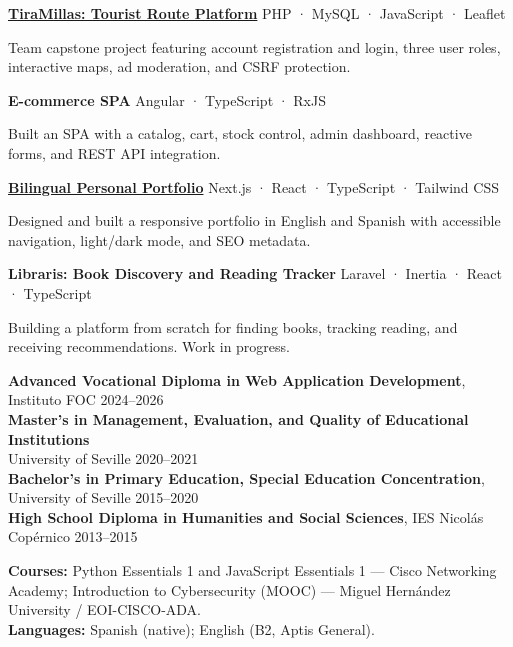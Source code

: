 \documentclass[10pt]{article}
\begin{document}
\textbf{\href{https://github.com/Loreber/TiraMillas}{TiraMillas: Tourist Route Platform}} \hfill PHP · MySQL · JavaScript · Leaflet

\entryspace
\begin{highlights}
  \item Team capstone project featuring account registration and login, three user roles, interactive maps, ad moderation, and CSRF protection.
\end{highlights}

\entryspace
\textbf{E-commerce SPA} \hfill Angular · TypeScript · RxJS

\entryspace
\begin{highlights}
  \item Built an SPA with a catalog, cart, stock control, admin dashboard, reactive forms, and REST API integration.
\end{highlights}

\entryspace
\textbf{\href{https://loreber.vercel.app/en}{Bilingual Personal Portfolio}} \hfill Next.js · React · TypeScript · Tailwind CSS

\entryspace
\begin{highlights}
  \item Designed and built a responsive portfolio in English and Spanish with accessible navigation, light/dark mode, and SEO metadata.
\end{highlights}

\entryspace
\textbf{Libraris: Book Discovery and Reading Tracker} \hfill Laravel · Inertia · React · TypeScript

\entryspace
\begin{highlights}
  \item Building a platform from scratch for finding books, tracking reading, and receiving recommendations. Work in progress.
\end{highlights}

\textbf{Advanced Vocational Diploma in Web Application Development}, Instituto FOC
\hfill 2024--2026\\[0.10cm]
\textbf{Master's in Management, Evaluation, and Quality of Educational Institutions}\\[-0.02cm]
University of Seville \hfill 2020--2021\\[0.10cm]
\textbf{Bachelor's in Primary Education, Special Education Concentration}, University of Seville
\hfill 2015--2020\\[0.10cm]
\textbf{High School Diploma in Humanities and Social Sciences}, IES Nicolás Copérnico
\hfill 2013--2015

\textbf{Courses:} Python Essentials 1 and JavaScript Essentials 1 --- Cisco Networking Academy; Introduction to Cybersecurity (MOOC) --- Miguel Hernández University / EOI-CISCO-ADA.\\[0.10cm]
\textbf{Languages:} Spanish (native); English (B2, Aptis General).
\end{document}
